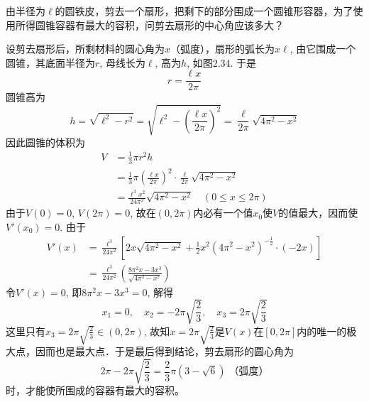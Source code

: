 \begin{example}
由半径为$\ell$的圆铁皮，剪去一个扇形，把剩下的部分围成一个圆锥形容器，为了使用所得圆锥容器有最大的容积，问剪去扇形的中心角应该多大？
\end{example}

\begin{figure}[htp]
    \centering
{}
    \caption{}
\end{figure}


\begin{solution}
    设剪去扇形后，所剩材料的圆心角为$x$（弧度），扇形的弧长为$x\ell$, 由它围成一个圆锥，其底面半径为$r$, 母线长为$\ell$, 高为$h$, 如图2.34. 于是
\[r=\frac{\ell x}{2\pi}\]
圆锥高为
\[h=\sqrt{\ell^2-r^2}=\sqrt{\ell^2-\left(\frac{\ell x}{2\pi}\right)^2}=\frac{\ell }{2\pi}\sqrt{4\pi^2-x^2}\]
因此圆锥的体积为
\[\begin{split}
    V&=\frac{1}{3}\pi r^2 h\\
    &=\frac{1}{3}\pi\left(\frac{\ell x}{2\pi}\right)^2\cdot \frac{\ell}{2\pi}\sqrt{4\pi^2-x^2}\\
    &=\frac{\ell^3 x^2}{24\pi^2}\sqrt{4\pi^2-x^2}\quad (0\le x\le 2\pi)
\end{split}\]
由于$V(0)=0$, $V(2\pi)=0$, 故在$(0, 2\pi)$内必有一个值$x_0$使$V$的值最大，因而使$V'(x_0)=0$. 由于
\[\begin{split}
    V'(x)&=\frac{\ell^3}{24\pi^2}\left[2x\sqrt{4\pi^2-x^2}+\frac{1}{2}x^2(4\pi^2-x^2)^{-\tfrac{1}{2}}\cdot (-2x)\right]\\
    &=\frac{\ell^3}{24\pi^2}\left(\frac{8\pi^2 x-3x^3}{\sqrt{4\pi^2-x^2}}\right)
\end{split}\]
令$V'(x)=0$, 即$8\pi^2 x-3x^3=0$, 解得
\[x_1=0,\quad x_2=-2\pi\sqrt{\frac{2}{3}}, \quad x_3=2\pi\sqrt{\frac{2}{3}}\]
这里只有$x_3=2\pi\sqrt{\frac{2}{3}}\in (0, 2\pi)$, 故知$x=2\pi\sqrt{\frac{2}{3}}$是$V(x)$在$[0, 2\pi]$内的唯一的极大点，因而也是最大点．于是最后得到结论，剪去扇形的圆心角为
\[2\pi-2\pi\sqrt{\frac{2}{3}}=\frac{2}{3}\pi\left(3-\sqrt{6}\right)\; \text{（弧度）}\]
时，才能使所围成的容器有最大的容积。
\end{solution}

